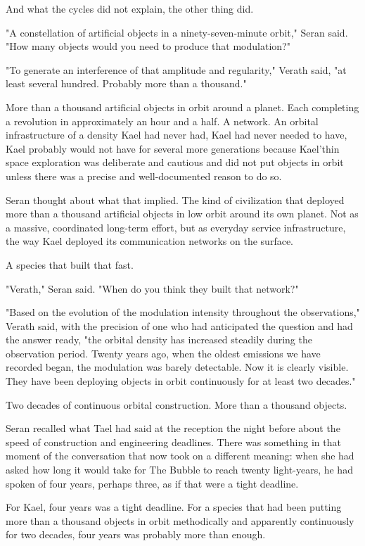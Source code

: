 \documentclass[11pt,a5paper,twoside]{book}
\begin{document}
And what the cycles did not explain, the other thing did.

"A constellation of artificial objects in a ninety-seven-minute orbit," Seran said. "How many objects would you need to produce that modulation?"

"To generate an interference of that amplitude and regularity," Verath said, "at least several hundred. Probably more than a thousand."

More than a thousand artificial objects in orbit around a planet. Each completing a revolution in approximately an hour and a half. A network. An orbital infrastructure of a density Kael had never had, Kael had never needed to have, Kael probably would not have for several more generations because Kael'thin space exploration was deliberate and cautious and did not put objects in orbit unless there was a precise and well-documented reason to do so.

Seran thought about what that implied. The kind of civilization that deployed more than a thousand artificial objects in low orbit around its own planet. Not as a massive, coordinated long-term effort, but as everyday service infrastructure, the way Kael deployed its communication networks on the surface.

A species that built that fast.

"Verath," Seran said. "When do you think they built that network?"

"Based on the evolution of the modulation intensity throughout the observations," Verath said, with the precision of one who had anticipated the question and had the answer ready, "the orbital density has increased steadily during the observation period. Twenty years ago, when the oldest emissions we have recorded began, the modulation was barely detectable. Now it is clearly visible. They have been deploying objects in orbit continuously for at least two decades."

Two decades of continuous orbital construction. More than a thousand objects.

Seran recalled what Tael had said at the reception the night before about the speed of construction and engineering deadlines. There was something in that moment of the conversation that now took on a different meaning: when she had asked how long it would take for The Bubble to reach twenty light-years, he had spoken of four years, perhaps three, as if that were a tight deadline.

For Kael, four years was a tight deadline. For a species that had been putting more than a thousand objects in orbit methodically and apparently continuously for two decades, four years was probably more than enough.
\end{document}
